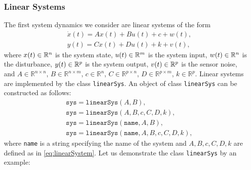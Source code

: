 \subsubsection{Linear Systems} \label{sec:linearSystems}

The first system dynamics we consider are linear systems of the form
\begin{equation}\label{eq:linearSystem}
\begin{split}
	& \dot{x}(t) = A x(t) + B u(t) + c + w(t), \\
	& y(t) = C x(t) + D u(t) + k + v(t),
\end{split}
\end{equation} 
where $x(t) \in \mathbb{R}^n$ is the system state, $u(t)\in \mathbb{R}^m$ is the system input, $w(t) \in \mathbb{R}^n$ is the disturbance, $y(t) \in \mathbb{R}^p$ is the system output, $v(t) \in \mathbb{R}^p$ is the sensor noise, and $A \in \mathbb{R}^{n \times n}$, $B \in \mathbb{R}^{n \times m}$, $c \in \mathbb{R}^n$, $C \in \mathbb{R}^{p \times n}$, $D \in \mathbb{R}^{p \times m}$, $k \in \mathbb{R}^p$.
Linear systems are implemented by the class \texttt{linearSys}. An object of class \texttt{linearSys} can be constructed as follows:
\begin{equation*}
	\begin{split}
		& \texttt{sys} = \texttt{linearSys}(A,B), \\
		& \texttt{sys} = \texttt{linearSys}(A,B,c,C,D,k), \\
		& \texttt{sys} = \texttt{linearSys}(\texttt{name},A,B), \\
		& \texttt{sys} = \texttt{linearSys}(\texttt{name},A,B,c,C,D,k),
	\end{split}
\end{equation*} 
where \texttt{name} is a string specifying the name of the system and $A,B,c,C,D,k$ are defined as in \eqref{eq:linearSystem}. Let us demonstrate the class \texttt{linearSys} by an example:

